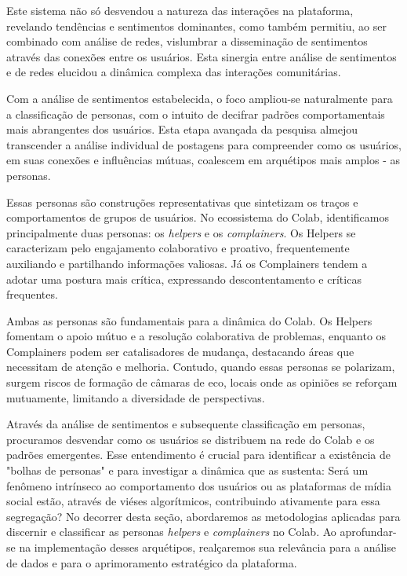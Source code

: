 Este sistema não só desvendou a natureza das interações na plataforma, revelando tendências e sentimentos dominantes, como também permitiu, ao ser combinado com análise de redes, vislumbrar a disseminação de sentimentos através das conexões entre os usuários. Esta sinergia entre análise de sentimentos e de redes elucidou a dinâmica complexa das interações comunitárias.

Com a análise de sentimentos estabelecida, o foco ampliou-se naturalmente para a classificação de personas, com o intuito de decifrar padrões comportamentais mais abrangentes dos usuários. Esta etapa avançada da pesquisa almejou transcender a análise individual de postagens para compreender como os usuários, em suas conexões e influências mútuas, coalescem em arquétipos mais amplos - as personas.

Essas personas são construções representativas que sintetizam os traços e comportamentos de grupos de usuários. No ecossistema do Colab, identificamos principalmente duas personas: os \textit{helpers} e os \textit{complainers}. Os Helpers se caracterizam pelo engajamento colaborativo e proativo, frequentemente auxiliando e partilhando informações valiosas. Já os Complainers tendem a adotar uma postura mais crítica, expressando descontentamento e críticas frequentes.

Ambas as personas são fundamentais para a dinâmica do Colab. Os Helpers fomentam o apoio mútuo e a resolução colaborativa de problemas, enquanto os Complainers podem ser catalisadores de mudança, destacando áreas que necessitam de atenção e melhoria. Contudo, quando essas personas se polarizam, surgem riscos de formação de câmaras de eco, locais onde as opiniões se reforçam mutuamente, limitando a diversidade de perspectivas.

Através da análise de sentimentos e subsequente classificação em personas, procuramos desvendar como os usuários se distribuem na rede do Colab e os padrões emergentes. Esse entendimento é crucial para identificar a existência de "bolhas de personas" e para investigar a dinâmica que as sustenta: Será um fenômeno intrínseco ao comportamento dos usuários ou as plataformas de mídia social estão, através de viéses algorítmicos, contribuindo ativamente para essa segregação? No decorrer desta seção, abordaremos as metodologias aplicadas para discernir e classificar as personas \textit{helpers} e \textit{complainers} no Colab. Ao aprofundar-se na implementação desses arquétipos, realçaremos sua relevância para a análise de dados e para o aprimoramento estratégico da plataforma.

